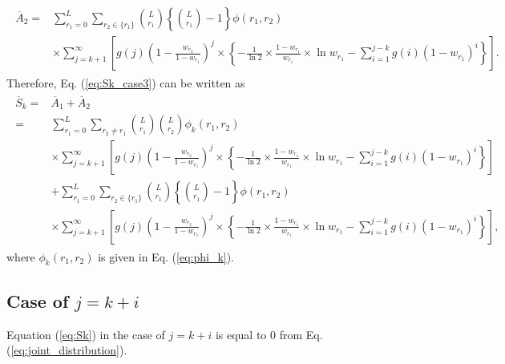 \begin{align}\begin{split}
	\overline{A}_2 =& \sum_{r_1=0}^{L} \sum_{r_2 \in \{r_1\}} \binom{L}{r_1}\left\{\binom{L}{r_1}-1\right\} \phi(r_1,r_2) \\
	&\times\sum_{j=k+1}^{\infty} \left[ g(j) \left(1-\frac{w_{r_2}}{1-w_{r_1}} \right)^{j} \times \left\{ -\frac{1}{\ln 2} \times \frac{1-w_{r_1}}{w_{r_1}} \times \ln w_{r_1} - \sum_{i=1}^{j-k} g(i)(1-w_{r_1})^{i} \right\} \right].
\end{split}\end{align}
%
Therefore, Eq. (\ref{eq:Sk_case3}) can be written as
\begin{align}\begin{split}
	\overline{S}_k =& \overline{A}_1 + \overline{A}_2 \\
	=& \sum_{r_1=0}^{L} \sum_{r_2 \neq r_1} \binom{L}{r_1}\binom{L}{r_2}\phi_k(r_1,r_2)\\
	&\times\sum_{j=k+1}^{\infty} \left[ g(j) \left(1-\frac{w_{r_2}}{1-w_{r_1}} \right)^{j} \times \left\{ -\frac{1}{\ln 2} \times \frac{1-w_{r_1}}{w_{r_1}} \times \ln w_{r_1} - \sum_{i=1}^{j-k} g(i)(1-w_{r_1})^{i} \right\} \right] \\
	&+\sum_{r_1=0}^{L} \sum_{r_2 \in \{r_1\}} \binom{L}{r_1}\left\{\binom{L}{r_1}-1\right\} \phi(r_1,r_2) \\
	&\times\sum_{j=k+1}^{\infty} \left[ g(j) \left(1-\frac{w_{r_2}}{1-w_{r_1}} \right)^{j} \times \left\{ -\frac{1}{\ln 2} 
	\times \frac{1-w_{r_1}}{w_{r_1}} \times \ln w_{r_1} - \sum_{i=1}^{j-k} g(i)(1-w_{r_1})^{i} \right\} \right],
\end{split}\end{align}
where $\phi_k(r_1,r_2)$ is given in Eq. (\ref{eq:phi_k}).
\subsection{Case of $j=k+i$}
Equation (\ref{eq:Sk}) in the case of $j=k+i$ is equal to $0$ from Eq. (\ref{eq:joint_distribution}).

